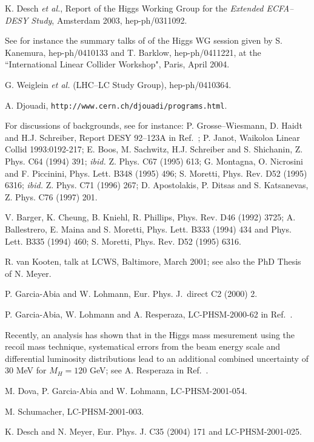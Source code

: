 \begin{thebibliography}{999}
 K. Desch {\it et al.}, Report of the Higgs Working Group for the
{\it Extended ECFA--DESY Study}, Amsterdam 2003, hep-ph/0311092. 

 See for instance the summary talks of of the Higgs WG session
given by S. Kanemura, hep-ph/0410133 and T. Barklow, hep-ph/0411221, at the 
``International Linear Collider Workshop", Paris, April 2004. 

 G. Weiglein {\it et al.} (LHC--LC Study Group), 
hep-ph/0410364.

 A. Djouadi, {\tt http://www.cern.ch/djouadi/programs.html}.  

 For discussions of backgrounds, see for instance:
P. Grosse--Wiesmann, D. Haidt and H.J. Schreiber, Report DESY 92--123A in 
Ref.~\cite{ee-Review-DESY};  P. Janot, Waikoloa Linear Collid 1993:0192-217; 
E. Boos, M. Sachwitz, H.J. Schreiber and S. Shichanin,
Z. Phys. C64 (1994) 391; {\it ibid.} Z. Phys. C67 (1995) 613; 
G. Montagna, O. Nicrosini and F. Piccinini, Phys. Lett. B348 (1995) 496;
S. Moretti, Phys. Rev. D52 (1995) 6316; {\it ibid.} Z. Phys. C71 (1996) 267;
D. Apostolakis, P. Ditsas and S. Katsanevas, Z. Phys. C76 (1997) 201.

V. Barger, K. Cheung, B. Kniehl, R. Phillips, Phys. Rev. D46 (1992) 3725; 
A. Ballestrero, E. Maina and S. Moretti, Phys. Lett. B333 (1994) 434 and 
Phys. Lett. B335 (1994) 460; S. Moretti, Phys. Rev. D52 (1995) 6316. 

 R. van Kooten, talk at LCWS, Baltimore, March 2001;
see also the PhD Thesis of N. Meyer.  

 P. Garcia-Abia and W. Lohmann, Eur. Phys. J.\ direct C2 
(2000) 2.

 P. Garcia-Abia, W. Lohmann and A. Resperaza, 
LC-PHSM-2000-62 in Ref.~\cite{LC-Notes}.

 Recently, an analysis has shown that in the Higgs mass 
mesurement using the recoil mass technique, systematical errors from the beam 
energy scale and differential luminosity distributions lead to an additional 
combined uncertainty of 30 MeV for $M_H=120$ GeV; see A. Resperaza in 
Ref.~\cite{LCWS}.

 M. Dova, P. Garcia-Abia and W. Lohmann, LC-PHSM-2001-054. 

 M. Schumacher, LC-PHSM-2001-003.

 K. Desch and N. Meyer, Eur. Phys. J. C35 (2004) 171
and LC-PHSM-2001-025. 


\end{thebibliography}
